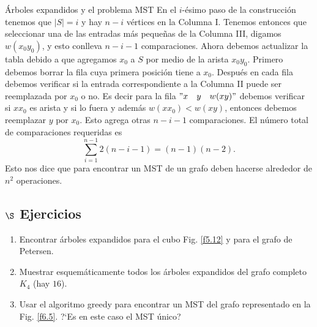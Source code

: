 \begin{section}{Árboles expandidos y el problema MST}
En el $i$-ésimo paso de la construcción tenemos que $|S|=i$ y hay
$n-i$ vértices en la Columna I. Tenemos entonces que seleccionar
una de las entradas más pequeñas de la Columna III, digamos
$w(x_0y_0)$, y esto conlleva $n-i-1$ comparaciones. Ahora debemos
actualizar la tabla debido a que agregamos $x_0$ a $S$ por medio
de la arista $x_0y_0$. Primero debemos borrar la fila cuya primera
posición tiene a $x_0$. Después en cada fila debemos verificar si
la entrada correspondiente a la Columna II puede ser reemplazada
por $x_0$ o no. Es decir para la fila $"x\quad y \quad w(xy)"$
debemos verificar si $xx_0$ es arista y si lo fuera y
además $w(xx_0) < w(xy)$, entonces debemos reemplazar $y$ por
$x_0$. Esto agrega otras $n-i-1$ comparaciones. El número total de
comparaciones requeridas es
$$
\sum_{i=1}^{n-1} 2(n-i-1) = (n-1)(n-2).
$$
Esto nos dice que para encontrar un MST de un grafo deben hacerse
alrededor de $n^2$ operaciones.


\subsection*{\Large $\S$ Ejercicios}
\begin{enumerate}
	\item Encontrar árboles expandidos para el cubo Fig. \ref{f5.12} y
	para el grafo de Petersen.
	\item Muestrar esquemáticamente todos los árboles expandidos del grafo
	completo $K_4$ (hay $16$).	
\item Usar el algoritmo greedy para encontrar un MST del grafo
representado en la Fig. \ref{f6.5}. ?`Es en este caso el MST único?


\end{enumerate}
\end{section}
